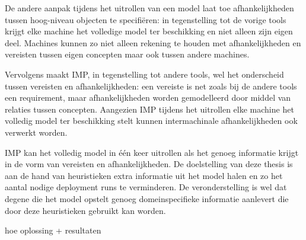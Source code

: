 De andere aanpak tijdens het uitrollen van een model laat toe afhankelijkheden tussen hoog-niveau objecten te specifi\"eren:
in tegenstelling tot de vorige tools krijgt elke machine het volledige model ter beschikking en niet alleen zijn eigen deel.
Machines kunnen zo niet alleen rekening te houden met afhankelijkheden en vereisten tussen eigen concepten maar ook tussen andere machines.

Vervolgens maakt IMP, in tegenstelling tot andere tools, wel het onderscheid tussen vereisten en afhankelijkheden:
een vereiste is net zoals bij de andere tools een requirement, maar afhankelijkheden worden gemodelleerd door middel van relaties tussen concepten.
Aangezien IMP tijdens het uitrollen elke machine het volledig model ter beschikking stelt kunnen intermachinale afhankelijkheden ook verwerkt worden.

IMP kan het volledig model in \'e\'en keer uitrollen als het genoeg informatie krijgt in de vorm van vereisten en afhankelijkheden.
De doelstelling van deze thesis is aan de hand van heuristieken extra informatie uit het model halen en zo het aantal nodige deployment runs te verminderen.
De veronderstelling is wel dat degene die het model opstelt genoeg domeinspecifieke informatie aanlevert die door deze heuristieken gebruikt kan worden.

 hoe oplossing + resultaten
